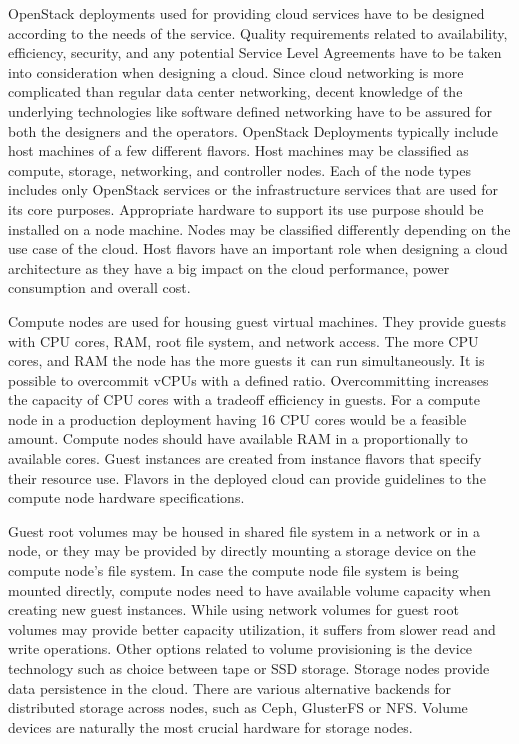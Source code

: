 OpenStack deployments used for providing cloud services have to be designed
according to the needs of the service. Quality requirements related to
availability, efficiency, security, and any potential Service Level Agreements
have to be taken into consideration when designing a cloud. Since cloud
networking is more complicated than regular data center networking, decent
knowledge of the underlying technologies like software defined networking have
to be assured for both the designers and the operators. OpenStack Deployments
typically include host machines of a few different flavors. Host machines may
be classified as compute, storage, networking, and controller nodes. Each of
the node types includes only OpenStack services or the infrastructure services
that are used for its core purposes. Appropriate hardware to support its use
purpose should be installed on a node machine. Nodes may be classified
differently depending on the use case of the cloud. Host flavors have an
important role when designing a cloud architecture as they have a big impact on
the cloud performance, power consumption and overall cost.

Compute nodes are used for housing guest virtual machines. They provide guests
with CPU cores, RAM, root file system, and network access. The more CPU cores,
and RAM the node has the more guests it can run simultaneously. It is possible
to overcommit vCPUs with a defined ratio. Overcommitting increases the capacity
of CPU cores with a tradeoff efficiency in guests. For a compute node in a
production deployment having 16 CPU cores would be a feasible amount. Compute
nodes should have available RAM in a proportionally to available cores. Guest
instances are created from instance flavors that specify their resource use.
Flavors in the deployed cloud can provide guidelines to the compute node
hardware specifications.

Guest root volumes may be housed in shared file system in a network or in a
node, or they may be provided by directly mounting a storage device on the
compute node's file system. In case the compute node file system is being
mounted directly, compute nodes need to have available volume capacity when
creating new guest instances. While using network volumes for guest root
volumes may provide better capacity utilization, it suffers from slower read
and write operations. Other options related to volume provisioning is the
device technology such as choice between tape or SSD storage. Storage nodes
provide data persistence in the cloud. There are various alternative backends
for distributed storage across nodes, such as Ceph, GlusterFS or NFS. Volume
devices are naturally the most crucial hardware for storage nodes.

